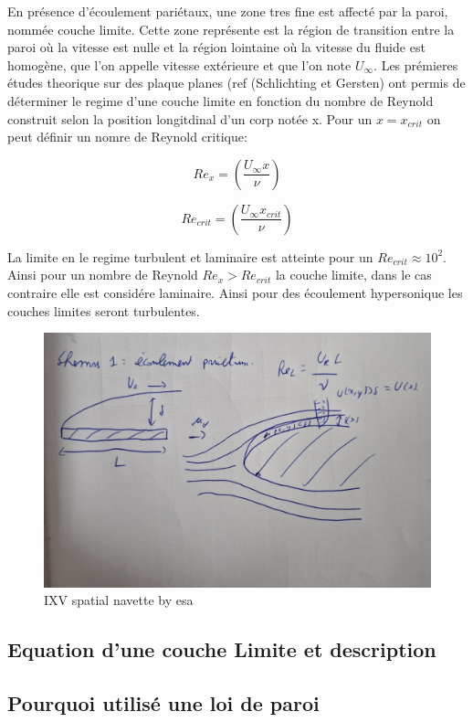 En présence d'écoulement pariétaux, une zone tres fine est affecté par la paroi, nommée couche limite. Cette zone représente est la région de transition entre la paroi où la vitesse est nulle et la région lointaine où la vitesse du fluide est homogène, que l’on appelle vitesse extérieure et que l’on note $U_\infty$. Les prémieres études theorique sur des plaque planes (ref (Schlichting et Gersten) ont permis de déterminer le regime d'une couche limite en fonction du nombre de Reynold construit selon la position longitdinal d'un corp notée x. Pour un $x=x_{crit}$ on peut définir un nomre de Reynold critique:

$$Re_x=\left(\frac{U_{\infty}x}{\nu}\right)$$

$$Re_{crit}=\left(\frac{U_{\infty}x_{crit}}{\nu}\right)$$

La limite en le regime turbulent et laminaire est atteinte pour un $Re_{crit} \approx 10^2$. Ainsi pour un nombre de Reynold $Re_x > Re_{crit}$ la couche limite, dans le cas contraire elle est considére laminaire. Ainsi pour des écoulement hypersonique les couches limites seront turbulentes.
\begin{figure}[!ht]
 \centering
 \includegraphics[width=0.7\linewidth]{chapter5_wall_models/pictures/wm1.jpg}
 \vspace{-2ex}
 \caption{IXV spatial navette by esa}
  \vspace{2ex}
 \label{chap1}
\end{figure}

\subsection{Equation d'une couche Limite et description}
\subsection{Pourquoi utilisé une loi de paroi}
